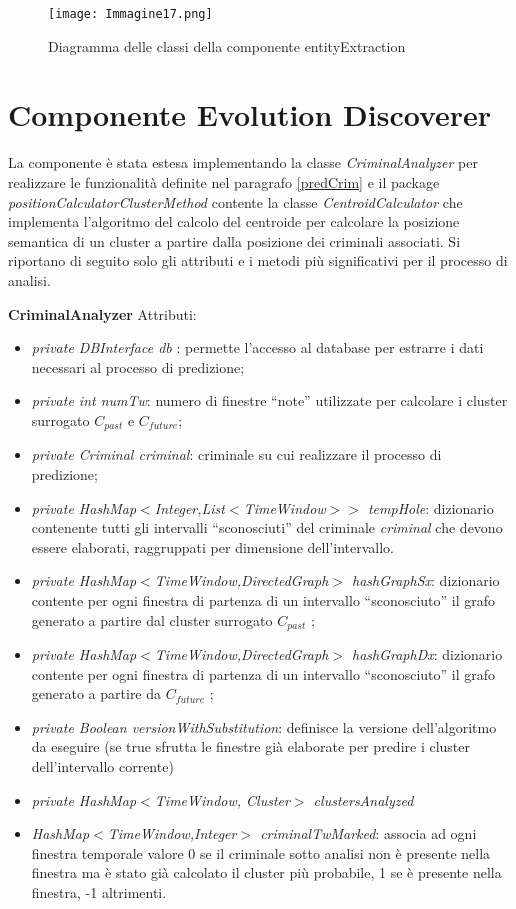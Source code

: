 \begin{figure}[H]
	\centering
	\texttt{[image: Immagine17.png]}
	\caption{Diagramma delle classi della componente entityExtraction}
	\label{AlberoDipendenze}
\end{figure}
 
\section{Componente Evolution Discoverer}
La componente è stata estesa implementando la classe \textit{CriminalAnalyzer} per realizzare le funzionalità definite nel paragrafo \ref{predCrim} e il package \textit{positionCalculatorClusterMethod} contente la classe \textit{CentroidCalculator} che implementa l'algoritmo del calcolo del centroide per calcolare la posizione semantica di un cluster a partire dalla posizione dei criminali associati.
Si riportano di seguito solo gli attributi e i metodi più significativi per il processo di analisi.

\textbf{CriminalAnalyzer}
Attributi:
\begin{itemize}
	\item \textit{private DBInterface db }: permette l'accesso al database per estrarre i dati necessari al processo di predizione;
	\item \textit{private int numTw}: numero di finestre ``note'' utilizzate per calcolare i cluster surrogato $C_{past}$ e $C_{future}$;
	\item \textit{private Criminal criminal}: criminale su cui realizzare il processo di predizione;
	\item \textit{private HashMap$<$Integer,List$<$TimeWindow$>>$ tempHole}: dizionario contenente tutti gli intervalli ``sconosciuti'' del criminale \textit{criminal} che devono essere elaborati, raggruppati per dimensione dell'intervallo.
	\item \textit{private HashMap$<$TimeWindow,DirectedGraph$>$ hashGraphSx}: dizionario contente per ogni finestra di partenza di un intervallo ``sconosciuto'' il grafo generato a partire dal cluster surrogato $C_{past}$ ;
	\item 	\textit{private HashMap$<$TimeWindow,DirectedGraph$>$ hashGraphDx}: dizionario contente per ogni finestra di partenza di un intervallo ``sconosciuto'' il grafo generato a partire da $C_{future}$ ; 
	\item \textit{private Boolean versionWithSubstitution}: definisce la versione dell'algoritmo da eseguire (se true sfrutta le finestre già elaborate per predire i cluster dell'intervallo corrente) 
	\item \textit{private HashMap$<$TimeWindow, Cluster$>$ clustersAnalyzed}
	\item \textit{HashMap$<$TimeWindow,Integer$>$ criminalTwMarked}: associa ad ogni finestra temporale valore 0 se il criminale sotto analisi non è presente nella finestra ma è stato già calcolato il cluster più probabile, 1 se è presente nella finestra, -1 altrimenti.
\end{itemize}

